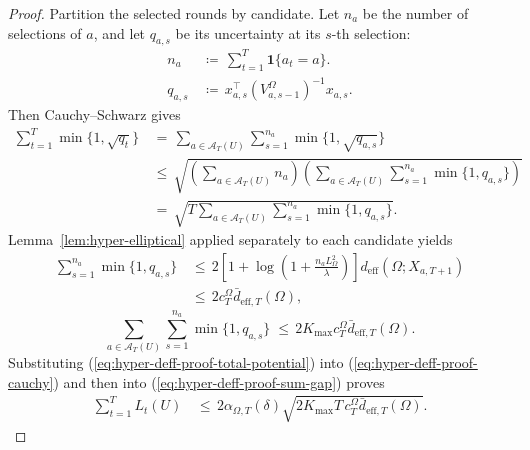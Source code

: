 \documentclass{article} %
\renewcommand{\eqref}[1]{\textup{(\ref{#1})}}
\begin{document}
\begin{proof}
Partition the selected rounds by candidate. Let \(n_a\) be the number of
selections of \(a\), and let \(q_{a,s}\) be its uncertainty at its \(s\)-th
selection:
\begin{align}
n_a
&\,\coloneqq\,
\sum_{t=1}^{T}\mathbf{1}\{a_t=a\}.
\label{eq:hyper-deff-proof-na}
\\
q_{a,s}
&\,\coloneqq\,
x_{a,s}^\top
\left(V_{a,s-1}^{\Omega}\right)^{-1}
x_{a,s}.
\label{eq:hyper-deff-proof-qas}
\end{align}
Then Cauchy--Schwarz gives
\begin{equation}
\label{eq:hyper-deff-proof-cauchy}
\begin{aligned}
\sum_{t=1}^{T}
\min\{1,\sqrt{q_t}\}
&\,=\,
\sum_{a\in\mathcal A_T(U)}
\sum_{s=1}^{n_a}
\min\{1,\sqrt{q_{a,s}}\}
\\
&\,\leq\,
\sqrt{
\left(
\sum_{a\in\mathcal A_T(U)}n_a
\right)
\left(
\sum_{a\in\mathcal A_T(U)}
\sum_{s=1}^{n_a}
\min\{1,q_{a,s}\}
\right)
}
\\
&\,=\,
\sqrt{
T
\sum_{a\in\mathcal A_T(U)}
\sum_{s=1}^{n_a}
\min\{1,q_{a,s}\}
}.
\end{aligned}
\end{equation}
Lemma~\ref{lem:hyper-elliptical} applied separately to each candidate yields
\begin{equation}
\label{eq:hyper-deff-proof-elliptical-per-arm}
\begin{aligned}
\sum_{s=1}^{n_a}
\min\{1,q_{a,s}\}
&\,\leq\,
2
\left[
1+\log\!\left(1+\frac{n_aL_{\Omega}^{2}}{\lambda}\right)
\right]
d_{\mathrm{eff}}(\Omega;X_{a,T+1})
\\
&\,\leq\,
2c_T^\Omega\bar d_{\mathrm{eff},T}(\Omega),
\end{aligned}
\end{equation}
\begin{equation}
\label{eq:hyper-deff-proof-total-potential}
\sum_{a\in\mathcal A_T(U)}
\sum_{s=1}^{n_a}
\min\{1,q_{a,s}\}
\;\leq\,
2K_{\max}c_T^\Omega
\bar d_{\mathrm{eff},T}(\Omega).
\end{equation}
Substituting \eqref{eq:hyper-deff-proof-total-potential} into \eqref{eq:hyper-deff-proof-cauchy} and then into \eqref{eq:hyper-deff-proof-sum-gap} proves
\begin{equation}
\label{eq:hyper-deff-proof-pathwise}
\begin{aligned}
\sum_{t=1}^{T}L_t(U)
&\,\leq\,
2\alpha_{\Omega,T}(\delta)
\sqrt{
2K_{\max}T\,c_T^\Omega
\bar d_{\mathrm{eff},T}(\Omega)
}.
\end{aligned}
\end{equation}

\end{proof}
\end{document}

